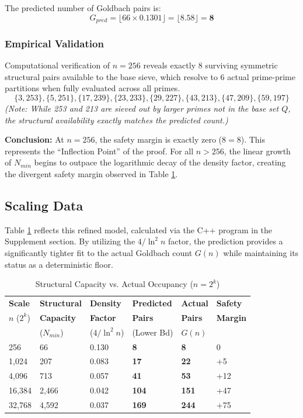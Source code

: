 \documentclass[sn-mathphys-num, pdflatex]{sn-jnl}
\begin{document}
The predicted number of Goldbach pairs is: 
\begin{equation}
G_{pred} = \lfloor 66 \times 0.1301 \rfloor = \lfloor 8.58 \rfloor = \textbf{8}
\end{equation}

\subsubsection*{Empirical Validation}

Computational verification of $n=256$ reveals exactly 8 surviving symmetric structural pairs available to the base sieve, which resolve to 6 actual prime-prime partitions when fully evaluated across all primes.
\begin{equation*}
\{3, 253\}, \{5, 251\}, \{17, 239\}, \{23, 233\}, \{29, 227\}, \{43, 213\}, \{47, 209\}, \{59, 197\}
\end{equation*}
\textit{(Note: While 253 and 213 are sieved out by larger primes not in the base set $Q$, the structural availability exactly matches the predicted count.)}

\textbf{Conclusion:} At $n=256$, the safety margin is exactly zero ($8=8$). This represents the ``Inflection Point'' of the proof. For all $n > 256$, the linear growth of $N_{min}$ begins to outpace the logarithmic decay of the density factor, creating the divergent safety margin observed in Table \ref{table:scaling_data}.


\subsection{Scaling Data}

Table \ref{table:scaling_data} reflects this refined model, calculated via the C++ program in the Supplement section. By utilizing the $4/\ln^2 n$ factor, the prediction provides a significantly tighter fit to the actual Goldbach count $G(n)$ while maintaining its status as a deterministic floor.

\begin{table}[!ht]
\centering
\caption{Structural Capacity vs. Actual Occupancy ($n=2^k$)}
\label{table:scaling_data}
\begin{tabular}{@{}llllll@{}}
\toprule
\textbf{Scale} & \textbf{Structural} & \textbf{Density} & \textbf{Predicted} & \textbf{Actual} & \textbf{Safety} \\ 
$n$ ($2^k$) & \textbf{Capacity} & \textbf{Factor} & \textbf{Pairs} & \textbf{Pairs} & \textbf{Margin} \\
& ($N_{min}$) & ($4/\ln^2 n$) & (Lower Bd) & $G(n)$ & \\ \midrule
256 & 66 & 0.130 & \textbf{8} & \textbf{8} & 0 \\
1,024 & 207 & 0.083 & \textbf{17} & \textbf{22} & +5 \\
4,096 & 713 & 0.057 & \textbf{41} & \textbf{53} & +12 \\
16,384 & 2,466 & 0.042 & \textbf{104} & \textbf{151} & +47 \\
32,768 & 4,592 & 0.037 & \textbf{169} & \textbf{244} & +75 \\ \bottomrule
\end{tabular}
\end{table}
\end{document}
